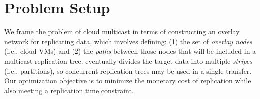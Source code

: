 \section{Problem Setup}

We frame the problem of cloud multicast in terms of constructing an overlay network for replicating data, which involves defining:
% 
(1) the set of \textit{overlay nodes} (i.e., cloud VMs) and (2) the \textit{paths} between those nodes that will be included in a multicast replication tree.
% 
\sys eventually divides the target data into multiple \textit{stripes} (i.e., partitions), so concurrent replication trees may be used in a single transfer.
Our optimization objective is to minimize the monetary cost of replication while also meeting a replication time constraint.
%
% 
% 
%



